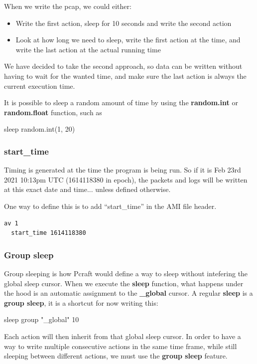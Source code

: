 \documentclass[10pt]{article}
\begin{document}
When we write the pcap, we could either:
\begin{itemize}
\item Write the first action, sleep for 10 seconds and write the second action
\item Look at how long we need to sleep, write the first action at the time, and write the last action at the actual running time
\end{itemize}

We have decided to take the second approach, so data can be written without having to wait for the wanted time, and make sure the last action is
always the current execution time.

It is possible to sleep a random amount of time by using the \textbf{random.int} or \textbf{random.float} function, such as
\begin{center}
  sleep random.int(1, 20)
\end{center}    


\subsubsection{start\_time}
Timing is generated at the time the program is being run. So if it is Feb 23rd 2021 10:13pm UTC (1614118380 in epoch), the packets and logs will be written at this exact date and time... unless defined otherwise.

One way to define this is to add ``start\_time'' in the AMI file header.

\begin{lstlisting}[caption={Setting start time},captionpos=b]
  av 1
  start_time 1614118380
\end{lstlisting}

\subsubsection{Group sleep}

Group sleeping is how Pcraft would define a way to sleep without intefering the global sleep cursor. When we execute the \textbf{sleep} function, what happens under the hood is an automatic assignment to the \textbf{\_global} cursor. A regular \textbf{sleep} is a \textbf{group sleep}, it is a shortcut for now writing this:
\begin{center}
  sleep group "\_global" 10
\end{center}

Each action will then inherit from that global sleep cursor. In order to have a way to write multiple consecutive actions in the same time frame, while still sleeping between different actions,  we must use the \textbf{group sleep} feature.
\end{document}
